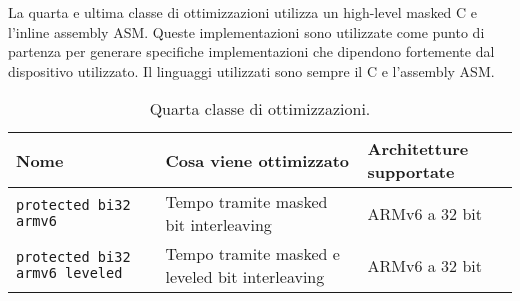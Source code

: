 \noindent La quarta e ultima classe di ottimizzazioni utilizza un high-level masked C e l'inline assembly ASM\cite{github}. Queste implementazioni sono utilizzate come punto di partenza per generare specifiche implementazioni che dipendono fortemente dal dispositivo utilizzato. Il linguaggi utilizzati sono sempre il C e l'assembly ASM.

\begin{table}[H]
    \centering
	\begin{tabular}{|m{}<{\centering}||m{}<{\centering}|m{}<{\centering}|}
		\hline
		\textbf{Nome} & \textbf{Cosa viene ottimizzato} & \textbf{Architetture supportate} \\
        \hline \hline
        \texttt{protected bi32 armv6} & Tempo tramite masked bit interleaving & ARMv6 a 32 bit \\
        \hline
        \texttt{protected bi32 armv6 leveled} & Tempo tramite masked e leveled bit interleaving & ARMv6 a 32 bit \\
        \hline
    \end{tabular}
    \caption{Quarta classe di ottimizzazioni.}
\end{table}
